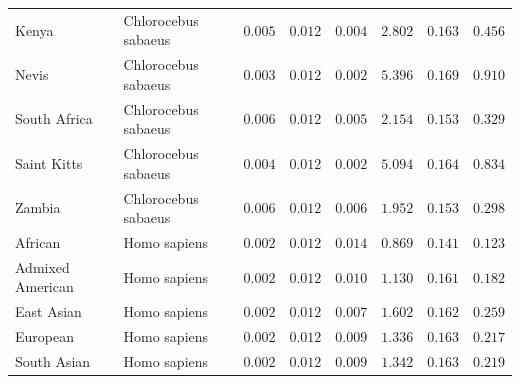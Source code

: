 \documentclass[12pt]{article}
\begin{document}
\begin{center}
\begin{longtable*}{|l|l|r|r|r|r|r|r|}
             Kenya & Chlorocebus sabaeus &               $ 0.005$ &              $ 0.012$ &              $ 0.004$ &                                          $ 2.802$ &                         $ 0.163$ &                      $ 0.456$ \\
             Nevis & Chlorocebus sabaeus &               $ 0.003$ &              $ 0.012$ &              $ 0.002$ &                                          $ 5.396$ &                         $ 0.169$ &                      $ 0.910$ \\
             South Africa & Chlorocebus sabaeus &               $ 0.006$ &              $ 0.012$ &              $ 0.005$ &                                          $ 2.154$ &                         $ 0.153$ &                      $ 0.329$ \\
             Saint Kitts & Chlorocebus sabaeus &               $ 0.004$ &              $ 0.012$ &              $ 0.002$ &                                          $ 5.094$ &                         $ 0.164$ &                      $ 0.834$ \\
             Zambia & Chlorocebus sabaeus &               $ 0.006$ &              $ 0.012$ &              $ 0.006$ &                                          $ 1.952$ &                         $ 0.153$ &                      $ 0.298$ \\
            African &        Homo sapiens &               $ 0.002$ &              $ 0.012$ &              $ 0.014$ &                                          $ 0.869$ &                         $ 0.141$ &                      $ 0.123$ \\
            Admixed American &        Homo sapiens &               $ 0.002$ &              $ 0.012$ &              $ 0.010$ &                                          $ 1.130$ &                         $ 0.161$ &                      $ 0.182$ \\
            East Asian &        Homo sapiens &               $ 0.002$ &              $ 0.012$ &              $ 0.007$ &                                          $ 1.602$ &                         $ 0.162$ &                      $ 0.259$ \\
            European &        Homo sapiens &               $ 0.002$ &              $ 0.012$ &              $ 0.009$ &                                          $ 1.336$ &                         $ 0.163$ &                      $ 0.217$ \\
            South Asian &        Homo sapiens &               $ 0.002$ &              $ 0.012$ &              $ 0.009$ &                                          $ 1.342$ &                         $ 0.163$ &                      $ 0.219$ \\
        \end{longtable*}
    \end{center}
\end{document}
